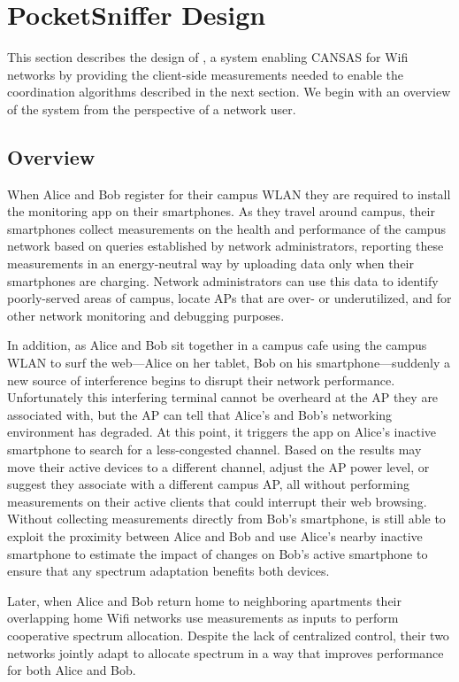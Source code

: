 \section{PocketSniffer Design}
\label{sec-design}

This section describes the design of \PS{}, a system enabling CANSAS for Wifi
networks by providing the client-side measurements needed to enable the
coordination algorithms described in the next section. We begin with an
overview of the \PS{} system from the perspective of a network user.

\subsection{Overview}

When Alice and Bob register for their campus WLAN they are required to
install the \PS{} monitoring app on their smartphones. As they travel around
campus, their smartphones collect measurements on the health and performance
of the campus network based on queries established by network administrators,
reporting these measurements in an energy-neutral way by uploading data only
when their smartphones are charging. Network administrators can use this data
to identify poorly-served areas of campus, locate APs that are over- or
underutilized, and for other network monitoring and debugging purposes.

In addition, as Alice and Bob sit together in a campus cafe using the campus
WLAN to surf the web---Alice on her tablet, Bob on his smartphone---suddenly
a new source of interference begins to disrupt their network performance.
Unfortunately this interfering terminal cannot be overheard at the AP they
are associated with, but the AP can tell that Alice's and Bob's networking
environment has degraded. At this point, it triggers the \PS{} app on Alice's
inactive smartphone to search for a less-congested channel. Based on the
results \PS{} may move their active devices to a different channel, adjust
the AP power level, or suggest they associate with a different campus AP, all
without performing measurements on their active clients that could interrupt
their web browsing. Without collecting measurements directly from Bob's
smartphone, \PS{} is still able to exploit the proximity between Alice and
Bob and use Alice's nearby inactive smartphone to estimate the impact of
changes on Bob's active smartphone to ensure that any spectrum adaptation
benefits both devices.

Later, when Alice and Bob return home to neighboring apartments their
overlapping home Wifi networks use \PS{} measurements as inputs to perform
cooperative spectrum allocation. Despite the lack of centralized control,
their two networks jointly adapt to allocate spectrum in a way that improves
performance for both Alice and Bob.

